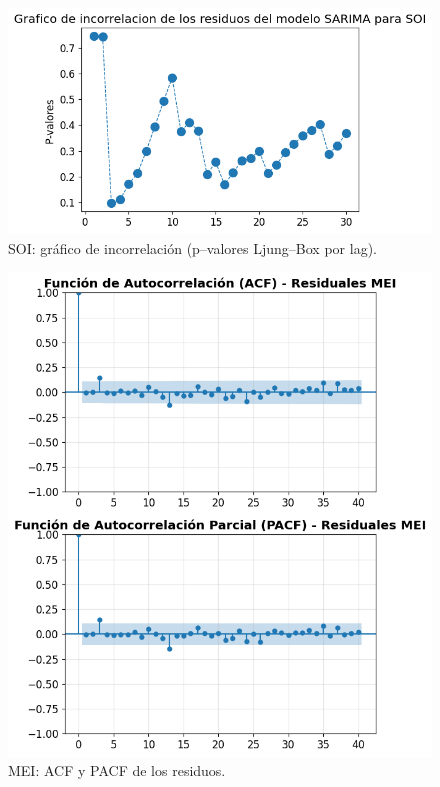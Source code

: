 \begin{figure}[H]\centering
\includegraphics[scale=.52]{Figures/inco_soi.png}
\caption{SOI: gráfico de incorrelación (p--valores Ljung--Box por lag).}
\label{fig:inco_soi}
\end{figure}



\begin{figure}[H]\centering
\includegraphics[scale=.52]{Figures/acf_pacf_res_mei.png}
\caption{MEI: ACF y PACF de los residuos.}
\label{fig:acf_pacf_res_mei}
\end{figure}

